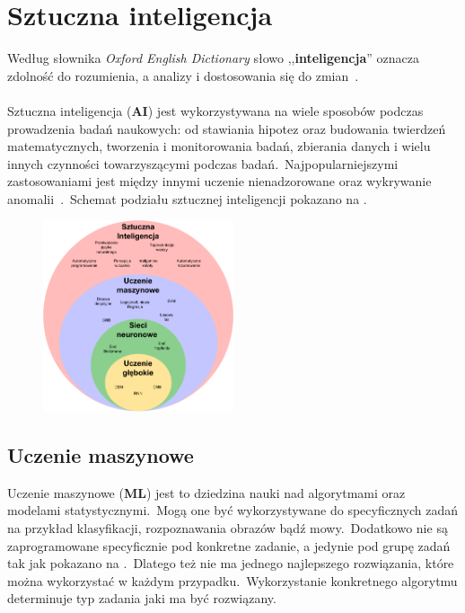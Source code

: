 \chapter{Sztuczna inteligencja}
Według słownika \textit{Oxford English Dictionary} słowo ,,\textbf{inteligencja}'' oznacza zdolność do rozumienia, a analizy i dostosowania się do zmian~\cite{OxfordJuly2023}.
\\ \\
Sztuczna inteligencja  (\textbf{AI}) jest wykorzystywana na wiele sposobów podczas prowadzenia badań naukowych: od stawiania hipotez oraz budowania twierdzeń matematycznych, tworzenia i monitorowania badań, zbierania danych i wielu innych czynności towarzyszącymi podczas badań.\ Najpopularniejszymi zastosowaniami jest między innymi uczenie nienadzorowane oraz wykrywanie anomalii~\cite{AiScience, Mahesh2018}.\ Schemat podziału sztucznej inteligencji pokazano na .

\begin{figure}[H]
    \centering
    \includegraphics[width=0.5\textwidth]{images/si}
    \label{fig:si-schema}
\end{figure}

\pagebreak

\section{Uczenie maszynowe}
Uczenie maszynowe  (\textbf{ML}) jest to dziedzina nauki nad algorytmami oraz modelami statystycznymi.\ Mogą one być wykorzystywane do specyficznych zadań na przykład klasyfikacji, rozpoznawania obrazów bądź mowy.\ Dodatkowo nie są zaprogramowane specyficznie pod konkretne zadanie, a jedynie pod grupę zadań tak jak pokazano na .\ Dlatego też nie ma jednego najlepszego rozwiązania, które można wykorzystać w każdym przypadku.\ Wykorzystanie konkretnego algorytmu determinuje typ zadania jaki ma być rozwiązany.

